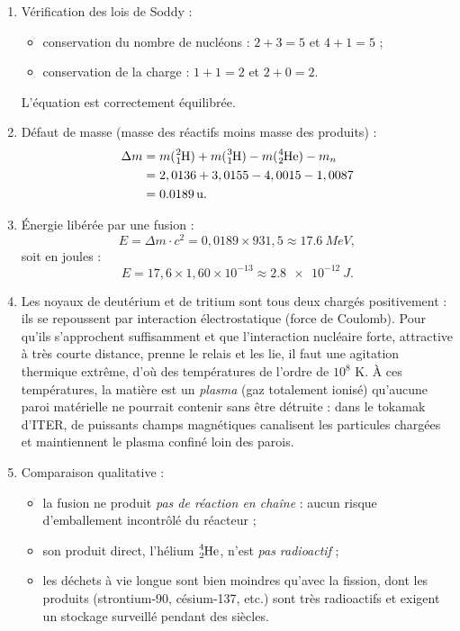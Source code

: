 \documentclass[11pt]{article}
\begin{document}
\begin{corrige}
\begin{enumerate}
\item Vérification des lois de Soddy :
\begin{itemize}
\item conservation du nombre de nucléons : $2 + 3 = 5$ et $4 + 1 = 5$ ;
\item conservation de la charge : $1 + 1 = 2$ et $2 + 0 = 2$.
\end{itemize}
L'équation est correctement équilibrée.
\item Défaut de masse (masse des réactifs moins masse des produits) :
\begin{align*}
\Delta m &= m(\ce{^{2}_{1}H}) + m(\ce{^{3}_{1}H}) - m(\ce{^{4}_{2}He}) - m_n \\
&= 2,0136 + 3,0155 - 4,0015 - 1,0087 \\
&= \SI{0,0189}{u}.
\end{align*}
\item Énergie libérée par une fusion :
\[ E = \Delta m \cdot c^2 = 0,0189 \times 931,5 \approx \SI{17,6}{MeV}, \]
soit en joules :
\[ E = 17,6 \times 1,60\times 10^{-13} \approx \SI{2,8e-12}{J}. \]
\item Les noyaux de deutérium et de tritium sont tous deux chargés positivement : ils se repoussent par interaction électrostatique (force de Coulomb). Pour qu'ils s'approchent suffisamment et que l'interaction nucléaire forte, attractive à très courte distance, prenne le relais et les lie, il faut une agitation thermique extrême, d'où des températures de l'ordre de $10^8$ K. À ces températures, la matière est un \emph{plasma} (gaz totalement ionisé) qu'aucune paroi matérielle ne pourrait contenir sans être détruite : dans le tokamak d'ITER, de puissants champs magnétiques canalisent les particules chargées et maintiennent le plasma confiné loin des parois.
\item Comparaison qualitative :
\begin{itemize}
\item la fusion ne produit \emph{pas de réaction en chaîne} : aucun risque d'emballement incontrôlé du réacteur ;
\item son produit direct, l'hélium $\ce{^{4}_{2}He}$, n'est \emph{pas radioactif} ;
\item les déchets à vie longue sont bien moindres qu'avec la fission, dont les produits (strontium-90, césium-137, etc.) sont très radioactifs et exigent un stockage surveillé pendant des siècles.

\end{itemize}
\end{enumerate}
\end{corrige}
\end{document}
